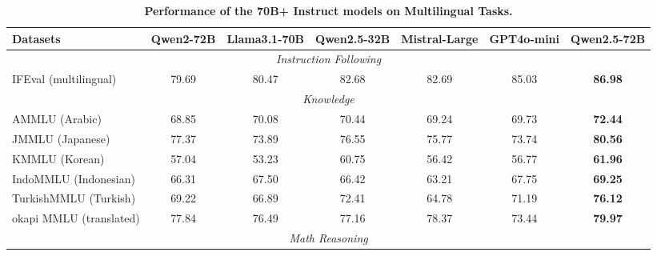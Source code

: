 \begin{table}[t]

\centering

\small

\caption{\textbf{Performance of the 70B+ Instruct models on Multilingual Tasks.}}

\label{tab:eval_multilingual_70B}

\setlength{\tabcolsep}{2.6pt}

\begin{tabular}{@{}lcccccc@{}}

\toprule

\textbf{Datasets} & \textbf{Qwen2-72B} & \textbf{Llama3.1-70B} & \textbf{Qwen2.5-32B} & \textbf{Mistral-Large} & \textbf{GPT4o-mini} & \textbf{Qwen2.5-72B} \\

\midrule

\multicolumn{7}{c}{\textit{Instruction Following}} \\

\midrule

IFEval (multilingual) & 79.69 & 80.47 & 82.68 & 82.69 & 85.03 & \textbf{86.98} \\

\midrule

\multicolumn{7}{c}{\textit{Knowledge}} \\

\midrule

AMMLU (Arabic) & 68.85 & 70.08 & 70.44 & 69.24 & 69.73 & \textbf{72.44} \\

JMMLU (Japanese) & 77.37 & 73.89 & 76.55 & 75.77 & 73.74 & \textbf{80.56} \\

KMMLU (Korean) & 57.04 & 53.23 & 60.75 & 56.42 & 56.77 & \textbf{61.96} \\

IndoMMLU (Indonesian) & 66.31 & 67.50 & 66.42 & 63.21 & 67.75 & \textbf{69.25} \\

TurkishMMLU (Turkish) & 69.22 & 66.89 & 72.41 & 64.78 & 71.19 & \textbf{76.12} \\

okapi MMLU (translated) & 77.84 & 76.49 & 77.16 & 78.37 & 73.44 & \textbf{79.97} \\

\midrule

\multicolumn{7}{c}{\textit{Math Reasoning}} \\


\end{tabular}
\end{table}

